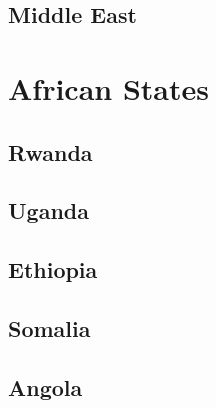 \subsection*{Middle East}

\section{African States}

\subsection*{Rwanda}

\subsection*{Uganda}

\subsection*{Ethiopia}

\subsection*{Somalia}

\subsection*{Angola}
